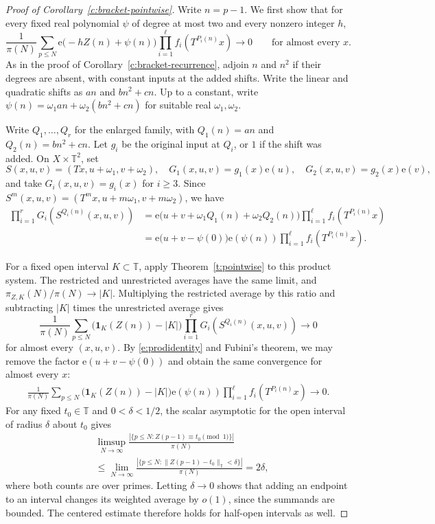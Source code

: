 \documentclass[12pt]{amsart}
\newcommand{\1}{\mathbf 1}
\newcommand{\e}{\mathrm e}
\theoremstyle{definition}
\begin{document}
\begin{proof}[Proof of Corollary~\ref{c:bracket-pointwise}]
Write $n=p-1$. We first show that for every fixed real polynomial
$\psi$ of degree at most two and every nonzero integer $h$,
\begin{equation}\label{e:quadratic-twist}
 \frac1{\pi(N)}\sum_{p\leq N}
 \e\bigl(-hZ(n)+\psi(n)\bigr)
 \prod_{i=1}^{\ell}f_i(T^{P_i(n)}x)
 \longrightarrow 0
 \qquad\text{for almost every }x.
\end{equation}
As in the proof of Corollary~\ref{c:bracket-recurrence}, adjoin
$n$ and $n^2$ if their degrees are absent, with constant inputs
at the added shifts. Write the linear and quadratic shifts as
$an$ and $bn^2+cn$. Up to a constant, write 
$\psi(n)=\omega_1 an+\omega_2(bn^2+cn)$ for suitable real
$\omega_1,\omega_2$.

Write $Q_1,\ldots,Q_r$ for the enlarged family, with $Q_1(n)=an$
and $Q_2(n)=bn^2+cn$. Let $g_i$ be the original input at $Q_i$,
or $1$ if the shift was added. On $X\times\mathbb T^2$, set
\[
 S(x,u,v)=(Tx,u+\omega_1,v+\omega_2),\quad
 G_1(x,u,v)=g_1(x)\e(u),\quad
 G_2(x,u,v)=g_2(x)\e(v),
\]
and take $G_i(x,u,v)=g_i(x)$ for $i\geq3$. Since
$S^m(x,u,v)=(T^m x,u+m\omega_1,v+m\omega_2)$, we have
\begin{align}\label{e:prodidentity}
 \prod_{i=1}^{r}G_i(S^{Q_i(n)}(x,u,v))
 &=\e\bigl(u+v+\omega_1Q_1(n)+\omega_2Q_2(n)\bigr)
   \prod_{i=1}^{\ell}f_i(T^{P_i(n)}x)\\
 &=\e\bigl(u+v-\psi(0)\bigr)\e(\psi(n))
   \prod_{i=1}^{\ell}f_i(T^{P_i(n)}x)\nonumber.
\end{align}

For a fixed open interval $K\subset\mathbb T$, apply
Theorem~\ref{t:pointwise} to this product system. The restricted
and unrestricted averages have the same limit, and
$\pi_{Z,K}(N)/\pi(N)\to |K|$. Multiplying the restricted average
by this ratio and subtracting $|K|$ times the unrestricted
average gives
\[
 \frac1{\pi(N)}\sum_{p\leq N}
 \bigl(\mathbf1_K(Z(n))-|K|\bigr)
 \prod_{i=1}^{r}G_i(S^{Q_i(n)}(x,u,v))
 \longrightarrow 0
\]
for almost every $(x,u,v)$. By \eqref{e:prodidentity} and
Fubini's theorem, we may remove the factor
$\e(u+v-\psi(0))$ and obtain the same convergence for almost
every $x$:
\begin{align}\label{diffsumtozero}
    \frac1{\pi(N)}\sum_{p\leq N}
 \bigl(\mathbf1_K(Z(n))-|K|\bigr)\e(\psi(n))
 \prod_{i=1}^{\ell}f_i(T^{P_i(n)}x)
 \longrightarrow 0 .
\end{align}
For any fixed $t_0\in\mathbb T$ and $0<\delta<1/2$, the scalar
asymptotic for the open interval of radius $\delta$ about $t_0$
gives
\begin{align*}
   & \limsup_{N\to\infty}
 \frac{|\{p\leq N: Z(p-1)\equiv t_0\pmod 1\}|}{\pi(N)}\\
 &\leq
 \lim_{N\to\infty}
 \frac{|\{p\leq N:\|Z(p-1)-t_0\|_{\mathbb T}<\delta\}|}{\pi(N)}
 =2\delta,
\end{align*}
where both counts are over primes. Letting $\delta\to0$ shows
that adding an endpoint to an interval changes its weighted
average by $o(1)$, since the summands are bounded. The centered
estimate therefore holds for half-open intervals as well.


\end{proof}
\end{document}
